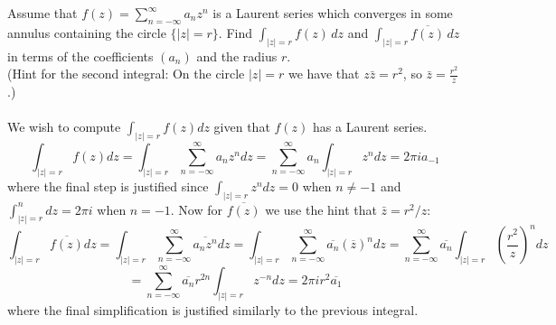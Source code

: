 \documentclass[11pt]{exam}
\newcommand{\C}{\mathbb{C}}
\newcommand{\ds}{\displaystyle}
\begin{document}
\begin{questions}

  \question Assume that $\ds f(z) = \sum_{n=-\infty}^\infty a_n z^n$
  is a Laurent series which converges in some annulus containing the
  circle $\{ |z|=r \}$. Find $\ds \int_{|z|=r} f(z) \, dz$ and $\ds
  \int_{|z|=r} \overline{f(z)} \, dz$ in terms of the coefficients
  $(a_n)$ and the radius $r$. \\ (Hint for the second integral: On the
  circle $|z|=r$ we have that $z \bar{z} = r^2$, so $\bar{z} =
  \frac{r^2}{z}$.) \\\\
  We wish to compute $\int _{|z|=r} f(z) dz$ given that $f(z)$ has a Laurent series.
  $$\int _{|z|=r} f(z) dz = \int _{|z|=r} \sum _{n=-\infty}^\infty a_n z^n dz = \sum _{n=-\infty}^\infty a_n \int _{|z| = r} z^n dz = 2 \pi i a_{-1}$$
  where the final step is justified since $\int _{|z| = r} z^n dz = 0$ when $n \neq -1$ and $\int _{|z| = r} ^n dz = 2 \pi i$ when $n = -1$.
  Now for $\overline{f(z)}$ we use the hint that $\bar z = r^2/z$:
  $$ \int _{|z|=r} \overline{f(z)} dz = \int _{|z|=r} \sum _{n=-\infty}^\infty \overline{a_n z^n} dz
  = \int _{|z|=r} \sum _{n=-\infty}^\infty \overline{a_n} (\overline{z})^n dz
  = \sum _{n=-\infty}^\infty \overline{a_n} \int _{|z|=r} \left( \frac{r^2}{z} \right) ^n dz$$
  $$
  = \sum _{n=-\infty}^\infty \overline{a_n} r^{2n} \int _{|z|=r} z^{-n} dz
  = 2 \pi i r^2 \overline{a_1} $$
  where the final simplification is justified similarly to the previous integral.

\end{questions}
\end{document}
